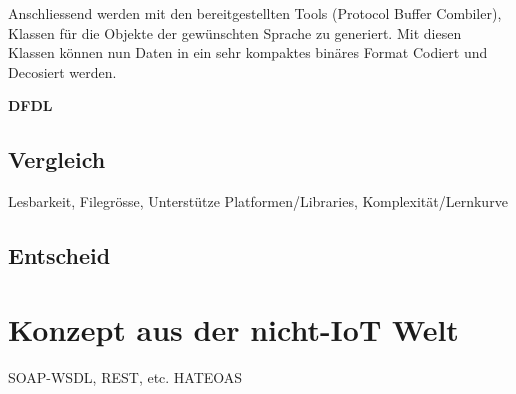 Anschliessend werden mit den bereitgestellten Tools (Protocol Buffer Combiler), Klassen für die Objekte der gewünschten Sprache zu generiert. Mit diesen Klassen können nun Daten in ein sehr kompaktes binäres Format Codiert und Decosiert werden.


\textbf{DFDL}


\subsection{Vergleich}

Lesbarkeit, Filegrösse, Unterstütze Platformen/Libraries, Komplexität/Lernkurve

\subsection{Entscheid}





\section{Konzept aus der nicht-IoT Welt}
SOAP-WSDL, REST, etc.
HATEOAS
